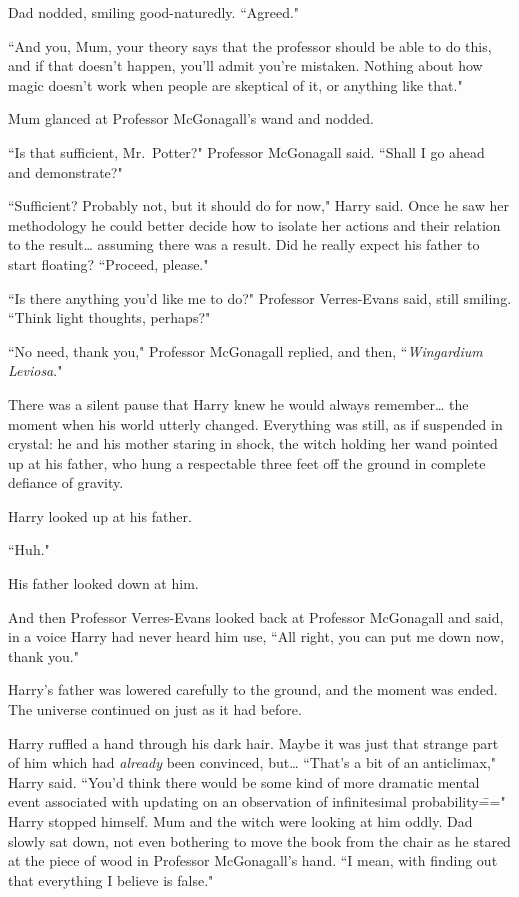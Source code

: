 Dad nodded, smiling good-naturedly. ``Agreed."

``And you, Mum, your theory says that the professor should be able to do this, and if that doesn't happen, you'll admit you're mistaken. Nothing about how magic doesn't work when people are skeptical of it, or anything like that."

Mum glanced at Professor McGonagall's wand and nodded.

``Is that sufficient, Mr.~Potter?" Professor McGonagall said. ``Shall I go ahead and demonstrate?"

``Sufficient? Probably not, but it should do for now," Harry said. Once he saw her methodology he could better decide how to isolate her actions and their relation to the result{\ldots} assuming there was a result. Did he really expect his father to start floating? ``Proceed, please."

``Is there anything you'd like me to do?" Professor Verres-Evans said, still smiling. ``Think light thoughts, perhaps?"

``No need, thank you," Professor McGonagall replied, and then, ``\emph{Wingardium Leviosa}."

There was a silent pause that Harry knew he would always remember{\ldots} the moment when his world utterly changed. Everything was still, as if suspended in crystal: he and his mother staring in shock, the witch holding her wand pointed up at his father, who hung a respectable three feet off the ground in complete defiance of gravity.

Harry looked up at his father.

``Huh."

His father looked down at him.

And then Professor Verres-Evans looked back at Professor McGonagall and said, in a voice Harry had never heard him use, ``All right, you can put me down now, thank you."

Harry's father was lowered carefully to the ground, and the moment was ended. The universe continued on just as it had before.

Harry ruffled a hand through his dark hair. Maybe it was just that strange part of him which had \emph{already} been convinced, but{\ldots} ``That's a bit of an anticlimax," Harry said. ``You'd think there would be some kind of more dramatic mental event associated with updating on an observation of infinitesimal probability\===" Harry stopped himself. Mum and the witch were looking at him oddly. Dad slowly sat down, not even bothering to move the book from the chair as he stared at the piece of wood in Professor McGonagall's hand. ``I mean, with finding out that everything I believe is false."


